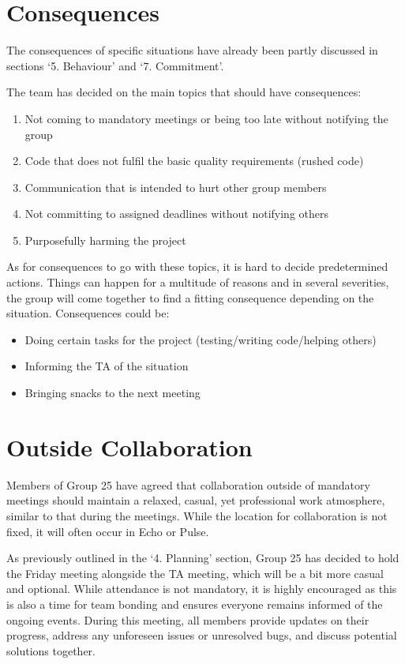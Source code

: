 \documentclass[sigconf,nonacm]{acmart}
\begin{document}
\section{Consequences}
The consequences of specific situations have already been partly discussed in sections ‘5. Behaviour’ and ‘7. Commitment’.

The team has decided on the main topics that should have consequences:
\begin{enumerate}
    \item Not coming to mandatory meetings or being too late without notifying the group
    \item Code that does not fulfil the basic quality requirements (rushed code)
    \item Communication that is intended to hurt other group members
    \item Not committing to assigned deadlines without notifying others
    \item Purposefully harming the project
\end{enumerate}

As for consequences to go with these topics, it is hard to decide predetermined actions. Things can happen for a multitude of reasons and in several severities, the group will come together to find a fitting consequence depending on the situation. Consequences could be:

\begin{itemize}
    \item Doing certain tasks for the project (testing/writing code/helping others)
    \item Informing the TA of the situation
    \item Bringing snacks to the next meeting
\end{itemize}

\section{Outside Collaboration}
Members of Group 25 have agreed that collaboration outside of mandatory meetings should maintain a relaxed, casual, yet professional work atmosphere, similar to that during the meetings. While the location for collaboration is not fixed, it will often occur in Echo or Pulse.

As previously outlined in the ‘4. Planning’ section, Group 25 has decided to hold the Friday meeting alongside the TA meeting, which will be a bit more casual and optional. While attendance is not mandatory, it is highly encouraged as this is also a time for team bonding and ensures everyone remains informed of the ongoing events. During this meeting, all members provide updates on their progress, address any unforeseen issues or unresolved bugs, and discuss potential solutions together.
\end{document}
